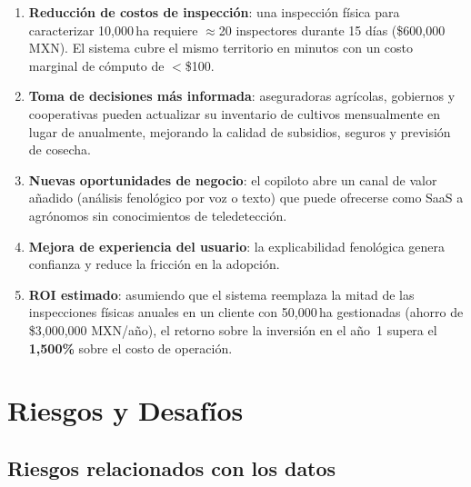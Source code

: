 \documentclass{article}
\begin{document}
\begin{enumerate}[leftmargin=*]
    \item \textbf{Reducción de costos de inspección}: una inspección física
    para caracterizar 10,000\,ha requiere $\approx$20 inspectores durante
    15 días (\$600,000 MXN). El sistema cubre el mismo territorio en minutos
    con un costo marginal de cómputo de $<$\$100.

    \item \textbf{Toma de decisiones más informada}: aseguradoras agrícolas,
    gobiernos y cooperativas pueden actualizar su inventario de cultivos
    mensualmente en lugar de anualmente, mejorando la calidad de subsidios,
    seguros y previsión de cosecha.

    \item \textbf{Nuevas oportunidades de negocio}: el copiloto abre un
    canal de valor añadido (análisis fenológico por voz o texto) que puede
    ofrecerse como SaaS a agrónomos sin conocimientos de teledetección.

    \item \textbf{Mejora de experiencia del usuario}: la explicabilidad
    fenológica genera confianza y reduce la fricción en la adopción.

    \item \textbf{ROI estimado}: asumiendo que el sistema reemplaza la mitad
    de las inspecciones físicas anuales en un cliente con 50,000\,ha
    gestionadas (ahorro de \$3,000,000 MXN/año), el retorno sobre la
    inversión en el año~1 supera el \textbf{1,500\%} sobre el costo de
    operación.
\end{enumerate}

\section{Riesgos y Desafíos}

\subsection{Riesgos relacionados con los datos}
\end{document}
